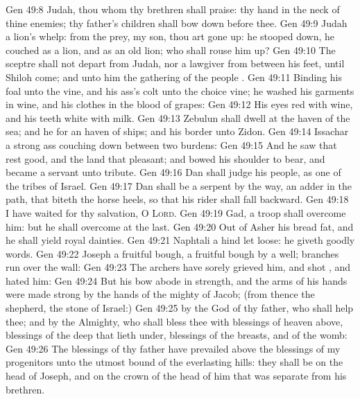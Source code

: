 \vs Gen 49:8 Judah, thou  whom thy brethren shall praise: thy hand  in the neck of thine enemies; thy father's children shall bow down before thee.
\vs Gen 49:9 Judah  a lion's whelp: from the prey, my son, thou art gone up: he stooped down, he couched as a lion, and as an old lion; who shall rouse him up?
\vs Gen 49:10 The sceptre shall not depart from Judah, nor a lawgiver from between his feet, until Shiloh come; and unto him  the gathering of the people .
\vs Gen 49:11 Binding his foal unto the vine, and his ass's colt unto the choice vine; he washed his garments in wine, and his clothes in the blood of grapes:
\vs Gen 49:12 His eyes  red with wine, and his teeth white with milk.
\vs Gen 49:13 Zebulun shall dwell at the haven of the sea; and he  for an haven of ships; and his border  unto Zidon.
\vs Gen 49:14 Issachar  a strong ass couching down between two burdens:
\vs Gen 49:15 And he saw that rest  good, and the land that  pleasant; and bowed his shoulder to bear, and became a servant unto tribute.
\vs Gen 49:16 Dan shall judge his people, as one of the tribes of Israel.
\vs Gen 49:17 Dan shall be a serpent by the way, an adder in the path, that biteth the horse heels, so that his rider shall fall backward.
\vs Gen 49:18 I have waited for thy salvation, O \textsc{Lord}.
\vs Gen 49:19 Gad, a troop shall overcome him: but he shall overcome at the last.
\vs Gen 49:20 Out of Asher his bread  fat, and he shall yield royal dainties.
\vs Gen 49:21 Naphtali  a hind let loose: he giveth goodly words.
\vs Gen 49:22 Joseph  a fruitful bough,  a fruitful bough by a well;  branches run over the wall:
\vs Gen 49:23 The archers have sorely grieved him, and shot , and hated him:
\vs Gen 49:24 But his bow abode in strength, and the arms of his hands were made strong by the hands of the mighty  of Jacob; (from thence  the shepherd, the stone of Israel:)
\vs Gen 49:25  by the God of thy father, who shall help thee; and by the Almighty, who shall bless thee with blessings of heaven above, blessings of the deep that lieth under, blessings of the breasts, and of the womb:
\vs Gen 49:26 The blessings of thy father have prevailed above the blessings of my progenitors unto the utmost bound of the everlasting hills: they shall be on the head of Joseph, and on the crown of the head of him that was separate from his brethren.
